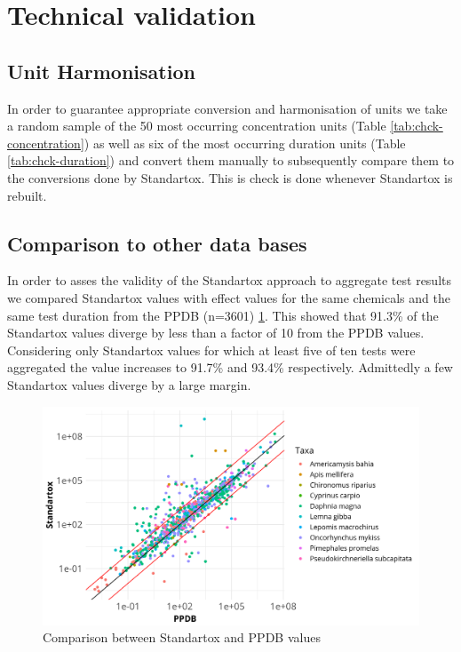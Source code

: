 \section{Technical validation}

\subsection{Unit Harmonisation}
In order to guarantee appropriate conversion and harmonisation of units we take a random sample of the 50 most occurring concentration units (Table \ref{tab:chck-concentration}) as well as six of the most occurring duration units (Table \ref{tab:chck-duration}) and convert them manually to subsequently compare them to the conversions done by Standartox. This is check is done whenever Standartox is rebuilt.

\subsection{Comparison to other data bases}
In order to asses the validity of the Standartox approach to aggregate test results we compared Standartox values with effect values for the same chemicals and the same test duration from the PPDB (n=3601) \ref{fig:standartox_ppdb_diff}. This showed that 91.3\% of the Standartox values diverge by less than a factor of 10 from the PPDB values. Considering only Standartox values for which at least five of ten tests were aggregated the value increases to 91.7\% and 93.4\% respectively. Admittedly a few Standartox values diverge by a large margin.

\begin{figure}
    \includegraphics[width=1\linewidth]{article/figures/gg_ppdb_stan_compare_continous.png}
    \caption{Comparison between Standartox and PPDB values}
    \label{fig:standartox_ppdb_diff}
\end{figure}


